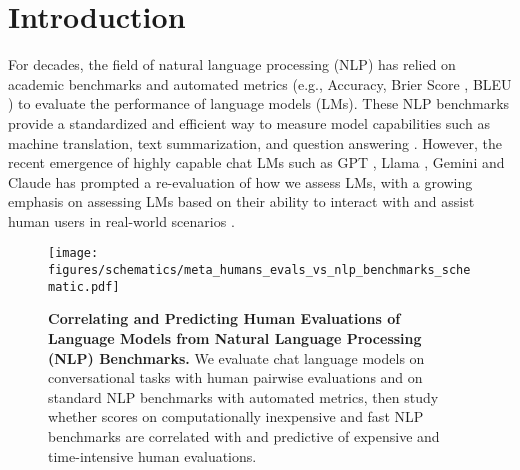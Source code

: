\section{Introduction}

For decades, the field of natural language processing (NLP) has relied on academic benchmarks and automated metrics (e.g., Accuracy, Brier Score \citep{brier1950verification}, BLEU \cite{papineni2002bleu}) to evaluate the performance of language models (LMs). These NLP benchmarks provide a standardized and efficient way to measure model capabilities such as machine translation, text summarization, and question answering \citep{wang2018glue,wang2019superglue,srivastava2022beyond,eleuther2023evalharness,wang2023decodingtrust}. However, the recent emergence of highly capable chat LMs such as GPT \citep{ouyang2022training,openai2023gpt4}, Llama \citep{touvron2023llama1, touvron2023llama2,dubey2024llama3herdmodels}, Gemini \citep{team2023gemini,reid2024gemini} and Claude \citep{anthropic2023claude3} has prompted a re-evaluation of how we assess LMs, with a growing emphasis on assessing LMs based on their ability to interact with and assist human users in real-world scenarios \citep{zheng2023lmsyschat1m,reuel2024openproblemstechnicalai}.


\begin{figure*}[t!]
    \centering
    \texttt{[image: figures/schematics/meta\_humans\_evals\_vs\_nlp\_benchmarks\_schematic.pdf]}
    \caption{\textbf{Correlating and Predicting Human Evaluations of Language Models from Natural Language Processing (NLP) Benchmarks.} We evaluate chat language models on conversational tasks with human pairwise evaluations and on standard NLP benchmarks with automated metrics, then study whether scores on computationally inexpensive and fast NLP benchmarks are correlated with and predictive of expensive and time-intensive human evaluations.}
    \label{fig:schematic}
\end{figure*}


